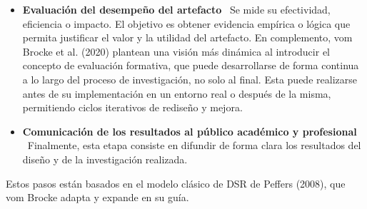 \begin{itemize}[align=left, label=--]
\item \textbf{Evaluación del desempeño del artefacto} \
Se mide su efectividad, eficiencia o impacto. El objetivo es obtener evidencia empírica o lógica que permita justificar el valor y la utilidad del artefacto.
En complemento, vom Brocke et al. (2020) plantean una visión más dinámica al introducir el concepto de evaluación formativa, que puede desarrollarse de forma continua a lo largo del proceso de investigación, no solo al final. Esta puede realizarse antes de su implementación en un entorno real o después de la misma, permitiendo ciclos iterativos de rediseño y mejora.

\item \textbf{Comunicación de los resultados al público académico y profesional} \
Finalmente, esta etapa consiste en difundir de forma clara los resultados del diseño y de la investigación realizada.
\end{itemize}

Estos pasos están basados en el modelo clásico de DSR de Peffers (2008), que vom Brocke adapta y expande en su guía.